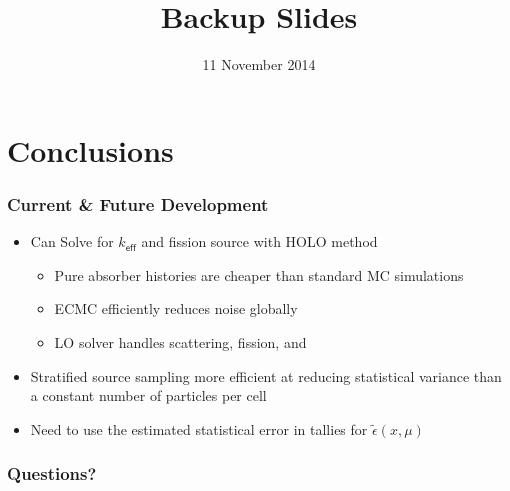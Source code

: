 \documentclass[xcolor=dvipsnames,handout]{beamer}
\newcommand{\keff}[0]{\ensuremath{{k}_{\textsf{eff}}} }
\newcommand{\coly}[1]{{\color{yellow} #1}}
\newlength{\wideitemsep}
\let\olditem\item
\renewcommand{\item}{\setlength{\itemsep}{\wideitemsep}\olditem}
\begin{document}
\begin{frame}
\end{frame}

\section{Conclusions}

\begin{frame}
    \frametitle{Current \& Future Development}
    \begin{itemize}
        \item Can Solve for $\keff$ and fission source with HOLO method
        \begin{itemize}
            \item Pure absorber histories are cheaper than standard MC simulations
            \item ECMC efficiently reduces noise globally 
            \item LO solver handles scattering, fission, and 
        \end{itemize}
        \item Stratified source sampling more efficient at reducing statistical
            variance than a constant number of particles per cell
        \item Need to use the estimated statistical error in tallies for $\tilde\epsilon(x,\mu)$ 
    \end{itemize}

\end{frame}


\date{11 November 2014}

\begin{frame}
    \frametitle{{\LARGE\coly{Questions?}}}
    \titlepage \vspace{-0.113in}
\end{frame}

\appendix

\title{Backup Slides}
\author{}
\date{}

\begin{frame}
    \titlepage
\end{frame}
\end{document}
